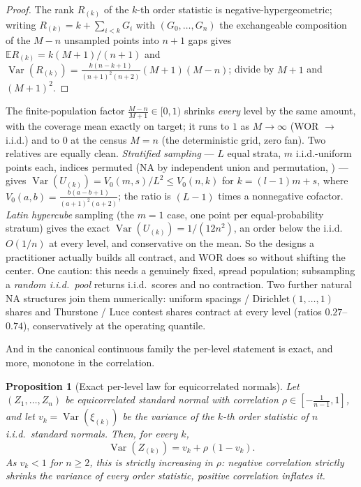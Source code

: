 \documentclass[11pt]{article}
\newtheorem{proposition}{Proposition}
\begin{document}
\begin{proof}
The rank $R_{(k)}$ of the $k$-th order statistic is negative-hypergeometric; writing
$R_{(k)}=k+\sum_{i<k}G_i$ with $(G_0,\dots,G_n)$ the exchangeable composition of the $M-n$ unsampled
points into $n+1$ gaps gives $\mathbb E R_{(k)}=k(M+1)/(n+1)$ and $\operatorname{Var}(R_{(k)})=
\tfrac{k(n-k+1)}{(n+1)^2(n+2)}(M+1)(M-n)$; divide by $M+1$ and $(M+1)^2$.
\end{proof}

The finite-population factor $\tfrac{M-n}{M+1}\in[0,1)$ shrinks \emph{every} level by the same amount,
with the coverage mean exactly on target; it runs to $1$ as $M\to\infty$ (WOR $\to$ i.i.d.) and to $0$ at
the census $M=n$ (the deterministic grid, zero fan). Two relatives are equally clean. \emph{Stratified sampling} ---
$L$ equal strata, $m$ i.i.d.-uniform points each, indices permuted (NA by independent union and
permutation, \citealp{joagdev1983}) --- gives $\operatorname{Var}(U_{(k)})=V_0(m,s)/L^2\le V_0(n,k)$ for
$k=(l-1)m+s$, where $V_0(a,b)=\tfrac{b(a-b+1)}{(a+1)^2(a+2)}$; the ratio is $(L-1)$ times a nonnegative
cofactor. \emph{Latin hypercube} sampling (the $m=1$ case, one point per equal-probability stratum) gives
the exact $\operatorname{Var}(U_{(k)})=1/(12n^2)$, an order below the i.i.d.\ $O(1/n)$ at every level, and
conservative on the mean. So the designs a practitioner actually builds all contract, and WOR does so
without shifting the center. One caution: this needs a genuinely fixed, spread population; subsampling a
\emph{random i.i.d.\ pool} returns i.i.d.\ scores and no contraction. Two further natural NA structures
join them numerically: uniform spacings / $\mathrm{Dirichlet}(1,\dots,1)$ shares and Thurstone / Luce
contest shares contract at every level (ratios $0.27$--$0.74$), conservatively at the operating quantile.

And in the canonical continuous family the per-level statement is exact, and more, monotone in the
correlation.

\begin{proposition}[Exact per-level law for equicorrelated normals]\label{prop:gauss}
Let $(Z_1,\dots,Z_n)$ be equicorrelated standard normal with correlation
$\rho\in[-\tfrac1{n-1},1]$, and let $v_k=\operatorname{Var}(\xi_{(k)})$ be the variance of the $k$-th
order statistic of $n$ i.i.d.\ standard normals. Then, for every $k$,
\begin{equation}
\operatorname{Var}(Z_{(k)})=v_k+\rho\,(1-v_k).
\end{equation}
As $v_k<1$ for $n\ge 2$, this is strictly increasing in $\rho$: negative correlation strictly shrinks
the variance of every order statistic, positive correlation inflates it.
\end{proposition}
\end{document}
